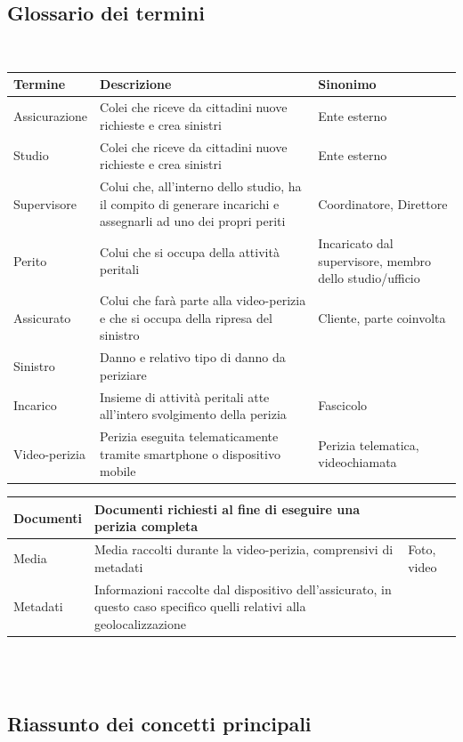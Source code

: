 \documentclass[a4paper,12pt]{report}
\begin{document}
\subsection{Glossario dei termini}
\mbox{}\\
\def\arraystretch{2}%
\begin{tabularx}{\textwidth}{ m{3cm} | m{6cm} | m{3cm}}
    \textbf{Termine} & \textbf{Descrizione} & \textbf{Sinonimo} \\
\hline
Assicurazione & Colei che riceve da cittadini nuove richieste e crea sinistri & Ente esterno\\ \hline
Studio & Colei che riceve da cittadini nuove richieste e crea sinistri & Ente esterno\\ \hline
Supervisore & Colui che, all’interno dello studio, ha il compito di generare incarichi e assegnarli ad uno dei propri periti & Coordinatore, Direttore\\ \hline
Perito & Colui che si occupa della attività peritali & Incaricato dal supervisore, membro dello studio/ufficio\\ \hline
Assicurato & Colui che farà parte alla video-perizia e che si occupa della ripresa del sinistro & Cliente, parte coinvolta\\ \hline
Sinistro & Danno e relativo tipo di danno da periziare & \\ \hline
Incarico & Insieme di attività peritali atte all’intero svolgimento della perizia & Fascicolo\\ \hline
Video-perizia & Perizia eseguita telematicamente tramite smartphone o dispositivo mobile & Perizia telematica, videochiamata
\\ 

\end{tabularx}
\noindent
\def\arraystretch{2}%
\begin{tabularx}{\textwidth}{ m{3cm} | m{6cm} | m{3cm}}
Documenti & Documenti richiesti al fine di eseguire una perizia completa & \\ \hline
Media & Media raccolti durante la video-perizia, comprensivi di metadati & Foto, video\\ \hline
Metadati & Informazioni raccolte dal dispositivo dell’assicurato, in questo caso specifico quelli relativi alla geolocalizzazione & \\
\end{tabularx}
\\
\\

\subsection{Riassunto dei concetti principali}
\end{document}
